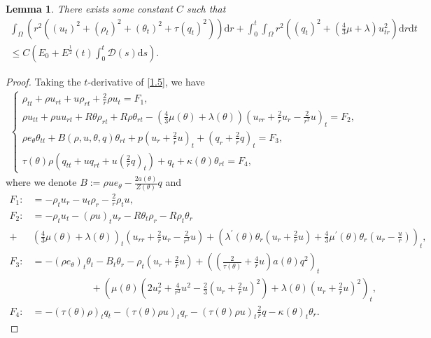 \documentclass[11pt,reqno]{amsart}
\numberwithin{equation}{section}
\newtheorem{lemma}[theorem]{Lemma}
\newcommand{\dif}{\mathrm{d}}
\begin{document}
\begin{lemma}\label{le2}
There exists some constant $C$ such that
\begin{align}\label{1.9}
 \int_{\Omega} \left( r^2 \left((u_t)^2+(\rho_t)^2+(\theta_t)^2+\tau (q_t)^2 \right)\right)  \dif r +\int_0^t \int_{\Omega} r^2 ((q_t)^2+(\frac{4}{3} \mu+\lambda) u_{tr}^2) \dif r \dif t \nonumber\\
 \le C(E_0+ E^\frac{1}{2}(t)\int_0^t  \mathcal D(s)\dif s).
\end{align}
\end{lemma}
 \begin{proof}
 Taking the $t$-derivative of \eqref{1.5}, we have
 \begin{align}\label{1.10}
 \begin{cases}
 \rho_{tt}+\rho u_{rt}+u \rho_{rt}+\frac{2}{r} \rho u_t=F_1,\\
 \rho u_{tt}+\rho u u_{rt}+R\theta \rho_{rt}+R\rho \theta_{rt}-(\frac{4}{3} \mu(\theta)+\lambda(\theta))\left(u_{rr}+\frac{2}{r} u_r-\frac{2}{r^2} u\right)_t=F_2,\\
 \rho e_\theta \theta_{tt}+B(\rho, u, \theta, q) \theta_{rt}+p \left(u_r+\frac{2}{r} u\right)_t+\left( q_r+\frac{2}{r}q\right)_t=F_3,\\
 \tau(\theta) \rho\left( q_{tt}+u q_{rt}+u \left(\frac{2}{r} q\right)_t\right)+q_t+\kappa(\theta) \theta_{rt}=F_4,
 \end{cases}
 \end{align}
 where   we denote $B:=\rho u e_\theta-\frac{2a(\theta)}{Z(\theta)} q$ and
 \begin{align*}
 F_1:&=-\rho_t u_r-u_t \rho_r-\frac{2}{r} \rho_t u,\\
 F_2:&=-\rho_t u_t-(\rho u)_t u_r-R \theta_t \rho_r-R \rho_t \theta_r \\
 +&\left(\frac{4}{3} \mu(\theta)+\lambda(\theta)\right)_t\left(u_{rr}+\frac{2}{r} u_r-\frac{2}{r^2} u\right)+\left(\lambda^\prime(\theta)\theta_r\left(u_r+\frac{2}{r}u\right)+\frac{4}{3}\mu^\prime(\theta) \theta_r\left(u_r-\frac{u}{r}\right)\right)_t,\\
 F_3:&= -(\rho e_\theta)_t \theta_t-B_t \theta_r-\rho_t\left(u_r+\frac{2}{r} u\right)+\left( \left(\frac{2}{\tau(\theta)}+\frac{4}{r} u\right)a(\theta) q^2 \right)_t\\
 &\qquad\qquad\qquad+\left(\mu(\theta)\left( 2u_r^2+\frac{4}{r^2}u^2-\frac{2}{3} \left(u_r+\frac{2}{r} u\right)^2\right)+\lambda(\theta)\left(u_r+\frac{2}{r} u\right)^2\right)_t,\\
 F_4:&=-(\tau(\theta) \rho)_t q_t -(\tau(\theta) \rho u)_t q_r-(\tau(\theta) \rho u)_t \frac{2}{r} q-\kappa(\theta)_t\theta_r.

\end{align*}
\end{proof}
\end{document}
